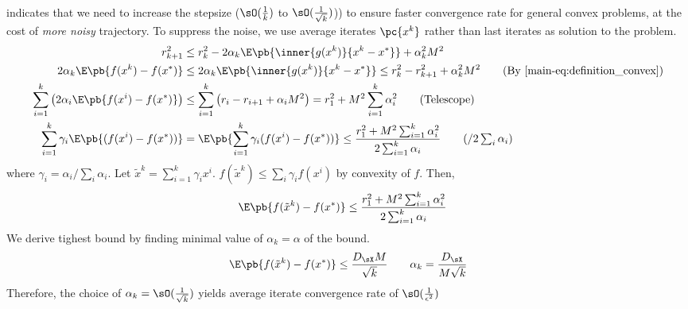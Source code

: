 \documentclass[../summary.tex]{subfiles}
\begin{document}
\cite{nemirovskiRobustStochasticApproximation2009} indicates that we need to increase the stepsize ($\sO(\frac{1}{k})$ to $\sO(\frac{1}{\sqrt{k}})$)) to ensure faster convergence rate for general convex problems, at the cost of \textit{more noisy} trajectory. To suppress the noise, we use average iterates $\pc{x^k}$ rather than last iterates as solution to the problem. 
\begin{align*}
    r_{k+1}^2
        &\leq r_k^2 - 2\alpha_k \E\pb{\inner{g(x^k)}{x^k-x^*}} + \alpha_k^2 M^2\\
    2\alpha_k \E\pb{ f(x^k) - f(x^*) }
        &\leq 2\alpha_k \E\pb{\inner{g(x^k)}{x^k - x^*}}
        \leq r_k^2 - r_{k+1}^2 + \alpha_k^2 M^2
            \tag{By \ref{main-eq:definition_convex}} \\
    \sum_{i=1}^k \left( 2\alpha_i \E\pb{f(x^i) - f(x^*)} \right)
        &\leq \sum_{i=1}^k \left( r_i - r_{i+1} + \alpha_i M^2\right)
        = r_1^2 + M^2 \sum_{i=1}^k \alpha_i^2  
            \tag{Telescope} \\
    \sum_{i=1}^k \gamma_i \E\pb{(f(x^i) - f(x^*))}
        &= \E\pb{\sum_{i=1}^k \gamma_i (f(x^i) - f(x^*))}
        \leq \frac{r_1^2 + M^2 \sum_{i=1}^k \alpha_i^2}{2\sum_{i=1}^k \alpha_i}
            \tag{$/ 2\sum_i\alpha_i$}
\end{align*}
where $\gamma_i = \alpha_i/\sum_i\alpha_i$. Let $\tilde{x}^k = \sum_{i=1}^k \gamma_i x^i$. $f(\tilde{x}^k)\leq \sum_i \gamma_i f(x^i)$ by convexity of $f$. Then,
\begin{align*}
    \E\pb{f(\tilde{x}^k) - f(x^*)}
        &\leq \frac{r_1^2 + M^2 \sum_{i=1}^k \alpha_i^2}{2\sum_{i=1}^k \alpha_i}
\end{align*}
We derive tighest bound by finding minimal value of $\alpha_k = \alpha$ of the bound.
\[
    \E\pb{f(\tilde{x}^k) - f(x^*)}
        \leq \frac{D_{\sX}M}{\sqrt{k}}
        \quad\quad
        \alpha_k = \frac{D_{\sX}}{M\sqrt{k}}
\]
Therefore, the choice of $\alpha_k = \sO(\frac{1}{\sqrt{k}})$ yields average iterate convergence rate of $\sO(\frac{1}{\epsilon^2})$
\end{document}
